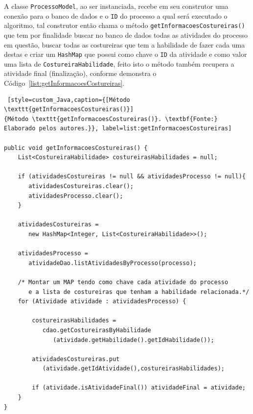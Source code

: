 \par A classe \texttt{ProcessoModel}, ao ser instanciada, recebe em seu construtor uma conexão para o 
banco de dados e o \texttt{ID} do processo a qual será executado o algoritmo, tal construtor então chama o método
\texttt{getInformacoesCostureiras()} que tem por finalidade buscar no banco de dados todas as atividades do processo em questão, 
buscar todas as costureiras que tem a habilidade de fazer cada uma destas e criar um \texttt{HashMap} que possui como chave o 
\texttt{ID} da atividade e como valor uma lista de \texttt{CostureiraHabilidade}, feito isto o método também recupera  a 
atividade final (finalização), conforme demonstra o Código~\ref{list:getInformacoesCostureiras}.


\begin{lstlisting} [style=custom_Java,caption={[Método \texttt{getInformacoesCostureiras()}]
{Método \texttt{getInformacoesCostureiras()}. \textbf{Fonte:}
Elaborado pelos autores.}}, label=list:getInformacoesCostureiras]

public void getInformacoesCostureiras() {
	List<CostureiraHabilidade> costureirasHabilidades = null;
	
	if (atividadesCostureiras != null && atividadesProcesso != null){
	   atividadesCostureiras.clear();
	   atividadesProcesso.clear();
	}
	
	atividadesCostureiras = 
	   new HashMap<Integer, List<CostureiraHabilidade>>();
	
	atividadesProcesso = 
	   atividadeDao.listAtividadesByProcesso(processo);
	
	/* Montar um MAP tendo como chave cada atividade do processo 
	   e a lista de costureiras que tenham a habilidade relacionada.*/
	for (Atividade atividade : atividadesProcesso) {
		
		costureirasHabilidades = 
		   cdao.getCostureirasByHabilidade
		      (atividade.getHabilidade().getIdHabilidade());
		
		atividadesCostureiras.put
		   (atividade.getIdAtividade(),costureirasHabilidades);
		
		if (atividade.isAtividadeFinal()) atividadeFinal = atividade;
	}
}

\end{lstlisting}

